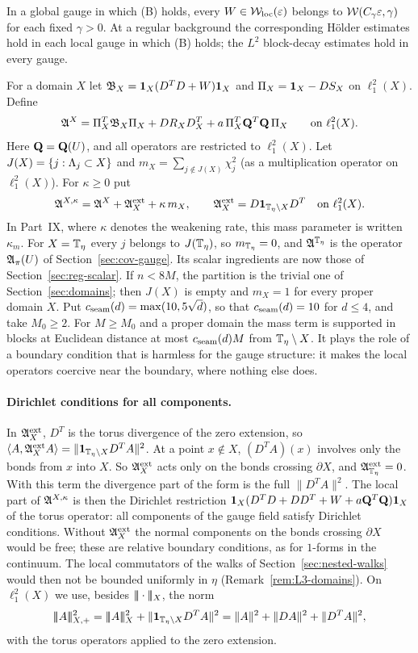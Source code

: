 In a global gauge in which (B) holds, every $W\in\mathcal W_{\rm loc}(\varepsilon)$ belongs to $\mathcal W(C_\gamma\varepsilon,\gamma)$ for each fixed $\gamma>0$. At a regular background the corresponding H\"older estimates hold in each local gauge in which (B) holds; the $L^2$ block-decay estimates hold in every gauge.

For a domain $X$ let $\mathfrak B_X=\mathbf 1_X(D^TD+W)\mathbf 1_X$ and $\Pi_X=\mathbf 1_X-DS_X$ on $\ell^2_1(X)$. Define
\[
\mathfrak A^X=\Pi_X^T\mathfrak B_X\Pi_X+DR_XD^T_X+a\,\Pi_X^T\mathbf Q^T\mathbf Q\,\Pi_X\qquad\text{on }\ell^2_1(X).
\]
Here $\mathbf Q=\mathbf Q(U)$, and all operators are restricted to $\ell^2_1(X)$. Let $J(X)=\{j:\Lambda_j\subset X\}$ and $m_X=\sum_{j\notin J(X)}\chi_j^2$ (as a multiplication operator on $\ell^2_1(X)$). For $\kappa\ge0$ put
\[
\mathfrak A^{X,\kappa}=\mathfrak A^X+\mathfrak A^{\rm ext}_X+\kappa\,m_X,\qquad\mathfrak A^{\rm ext}_X=D\mathbf 1_{\mathbb T_\eta\setminus X}D^T\quad\text{on }\ell^2_1(X).
\]
In Part~IX, where $\kappa$ denotes the weakening rate, this mass parameter is written $\kappa_m$.
For $X=\mathbb T_\eta$ every $j$ belongs to $J(\mathbb T_\eta)$, so $m_{\mathbb T_\eta}=0$, and $\mathfrak A^{\mathbb T_\eta}$ is the operator $\mathfrak A_\pi(U)$ of Section~\ref{sec:cov-gauge}. Its scalar ingredients are now those of Section~\ref{sec:reg-scalar}. If $n<8M$, the partition is the trivial one of Section~\ref{sec:domains}; then $J(X)$ is empty and $m_X=1$ for every proper domain $X$. Put $c_{\rm seam}(d)=\max(10,5\sqrt d)$, so that $c_{\rm seam}(d)=10$ for $d\le4$, and take $M_0\ge2$. For $M\ge M_0$ and a proper domain the mass term is supported in blocks at Euclidean distance at most $c_{\rm seam}(d)M$ from $\mathbb T_\eta\setminus X$. It plays the role of a boundary condition that is harmless for the gauge structure: it makes the local operators coercive near the boundary, where nothing else does.

\paragraph{Dirichlet conditions for all components.} In $\mathfrak A^{\rm ext}_X$, $D^T$ is the torus divergence of the zero extension, so $\langle A,\mathfrak A^{\rm ext}_XA\rangle=\|\mathbf 1_{\mathbb T_\eta\setminus X}D^TA\|^2$. At a point $x\notin X$, $(D^TA)(x)$ involves only the bonds from $x$ into $X$. So $\mathfrak A^{\rm ext}_X$ acts only on the bonds crossing $\partial X$, and $\mathfrak A^{\rm ext}_{\mathbb T_\eta}=0$. With this term the divergence part of the form is the full $\|D^TA\|^2$. The local part of $\mathfrak A^{X,\kappa}$ is then the Dirichlet restriction $\mathbf 1_X(D^TD+DD^T+W+a\mathbf Q^T\mathbf Q)\mathbf 1_X$ of the torus operator: all components of the gauge field satisfy Dirichlet conditions. Without $\mathfrak A^{\rm ext}_X$ the normal components on the bonds crossing $\partial X$ would be free; these are relative boundary conditions, as for $1$-forms in the continuum. The local commutators of the walks of Section~\ref{sec:nested-walks} would then not be bounded uniformly in $\eta$ (Remark~\ref{rem:L3-domains}). On $\ell^2_1(X)$ we use, besides $|\!|\!|\cdot|\!|\!|_X$, the norm
\[
\tn A_{X,+}^2=\tn A_X^2+\|\one_{\Tf\setminus X}D^TA\|^2=\|A\|^2+\|DA\|^2+\|D^TA\|^2 ,
\]
with the torus operators applied to the zero extension.

